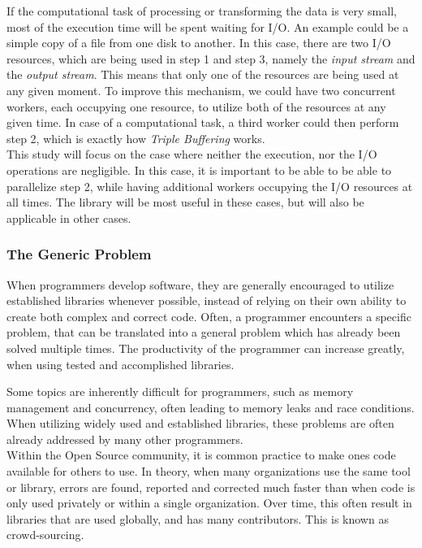 \documentclass[a4paper]{article}
\begin{document}
If the computational task of processing or transforming the data is very small, most of the execution time will be spent waiting for I/O. An example could be a simple copy of a file from one disk to another. In this case, there are two I/O resources, which are being used in step 1 and step 3, namely the \textit{input stream} and the \textit{output stream}. This means that only one of the resources are being used at any given moment. To improve this mechanism, we could have two concurrent workers, each occupying one resource, to utilize both of the resources at any given time. In case of a computational task, a third worker could then perform step 2, which is exactly how \textit{Triple Buffering} works.\\

This study will focus on the case where neither the execution, nor the I/O operations are negligible. In this case, it is important to be able to be able to parallelize step 2, while having additional workers occupying the I/O resources at all times. The library will be most useful in these cases, but will also be applicable in other cases.


\subsubsection{The Generic Problem}
When programmers develop software, they are generally encouraged to utilize established libraries whenever possible, instead of relying on their own ability to create both complex and correct code. Often, a programmer encounters a specific problem, that can be translated into a general problem which has already been solved multiple times. The productivity of the programmer can increase greatly, when using tested and accomplished libraries. 

Some topics are inherently difficult for programmers, such as memory management and concurrency, often leading to memory leaks and race conditions. When utilizing widely used and established libraries, these problems are often already addressed by many other programmers.\\

Within the Open Source community, it is common practice to make ones code available for others to use. In theory, when many organizations use the same tool or library, errors are found, reported and corrected much faster than when code is only used privately or within a single organization. Over time, this often result in libraries that are used globally, and has many contributors. This is known as crowd-sourcing.\\
\end{document}
